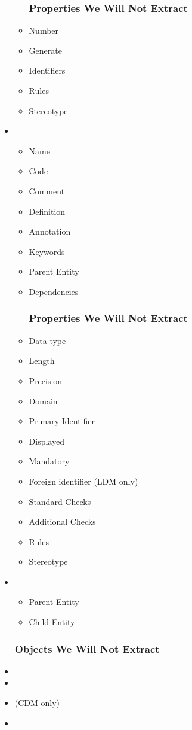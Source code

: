 \documentclass[12pt,a4paper]{report}
\begin{document}
\begin{itemize}
\begin{itemize}
		\subsubsection{Properties We Will Not Extract}
		\item Number
		\item Generate
		\item Identifiers
		\item Rules
		\item Stereotype
	\end{itemize}
	\item {}
	\begin{itemize}
		\item Name 
		\item Code 
		\item Comment
		\item Definition
		\item Annotation
		\item Keywords
		\item Parent Entity
		\item Dependencies
		\subsubsection{Properties We Will Not Extract}
		\item Data type 
		\item Length 
		\item Precision
		\item Domain
		\item Primary Identifier
		\item Displayed
		\item Mandatory
		\item Foreign identifier (LDM only)
		\item Standard Checks
		\item Additional Checks
		\item Rules
		\item Stereotype
	\end{itemize}
	\item {}
	\begin{itemize}
		\item Parent Entity
		\item Child Entity
	\end{itemize}
	\subsubsection{Objects We Will Not Extract}
	\item {}
	\item {}
	\item {} (CDM only)
	\item {}
\end{itemize}
\end{document}
